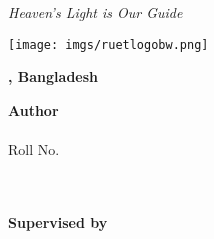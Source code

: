 \documentclass[document.tex]{subfiles}
\begin{document}
\begin{center}
        
        \textit{Heaven's Light is Our Guide}
        \vspace{1cm}
        
        \texttt{[image: imgs/ruetlogobw.png]}
        \vspace{1cm}
        
        \textbf{{\fontsize{12pt}{0.5cm}\selectfont \deptt}}
        \vspace{1cm}
        
        \textbf{{\fontsize{14pt}{0.5cm}\selectfont \ruet, Bangladesh}}
        \vspace{1cm}
        
        \textbf{{\fontsize{16pt}{0.5cm}\selectfont \thesistitle}}
        \vspace{1cm}
        
        {\fontsize{14pt}{0.5cm}\selectfont
                
                \textbf{Author}\\
                \authorname\\
                Roll No. \authorroll\\
                \dept\\
                \ruet\\
                \vspace{1cm}
                
                \textbf{Supervised by}\\
                \thesissupervisor\\
                \thesissupervisordesignation\\
                \dept\\
                \ruet\\
                \vspace{1cm}
        }
        
\end{center}
\clearpage
\end{document}
